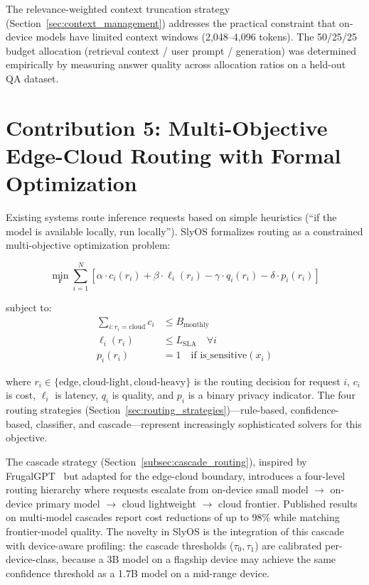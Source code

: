 \documentclass[12pt, letterpaper, twoside]{report}
\begin{document}
The relevance-weighted context truncation strategy (Section~\ref{sec:context_management}) addresses the practical constraint that on-device models have limited context windows (2,048--4,096 tokens). The 50/25/25 budget allocation (retrieval context / user prompt / generation) was determined empirically by measuring answer quality across allocation ratios on a held-out QA dataset.

\section{Contribution 5: Multi-Objective Edge-Cloud Routing with Formal Optimization}
\label{sec:novel_routing}

Existing systems route inference requests based on simple heuristics (``if the model is available locally, run locally''). SlyOS formalizes routing as a constrained multi-objective optimization problem:

\begin{equation}
\min_{\mathbf{r}} \sum_{i=1}^{N} \left[ \alpha \cdot c_i(r_i) + \beta \cdot \ell_i(r_i) - \gamma \cdot q_i(r_i) - \delta \cdot p_i(r_i) \right]
\label{eq:routing_objective}
\end{equation}

subject to:
\begin{align}
\sum_{i: r_i = \text{cloud}} c_i &\leq B_{\text{monthly}} \tag{budget constraint} \\
\ell_i(r_i) &\leq L_{\text{SLA}} \quad \forall i \tag{latency SLA} \\
p_i(r_i) &= 1 \quad \text{if } \text{is\_sensitive}(x_i) \tag{privacy constraint}
\end{align}

where $r_i \in \{\text{edge}, \text{cloud-light}, \text{cloud-heavy}\}$ is the routing decision for request $i$, $c_i$ is cost, $\ell_i$ is latency, $q_i$ is quality, and $p_i$ is a binary privacy indicator. The four routing strategies (Section~\ref{sec:routing_strategies})---rule-based, confidence-based, classifier, and cascade---represent increasingly sophisticated solvers for this objective.

The cascade strategy (Section~\ref{subsec:cascade_routing}), inspired by FrugalGPT~\cite{chen2023frugalgpt} but adapted for the edge-cloud boundary, introduces a four-level routing hierarchy where requests escalate from on-device small model $\to$ on-device primary model $\to$ cloud lightweight $\to$ cloud frontier. Published results on multi-model cascades report cost reductions of up to 98\% while matching frontier-model quality. The novelty in SlyOS is the integration of this cascade with device-aware profiling: the cascade thresholds ($\tau_0, \tau_1$) are calibrated per-device-class, because a 3B model on a flagship device may achieve the same confidence threshold as a 1.7B model on a mid-range device.
\end{document}
